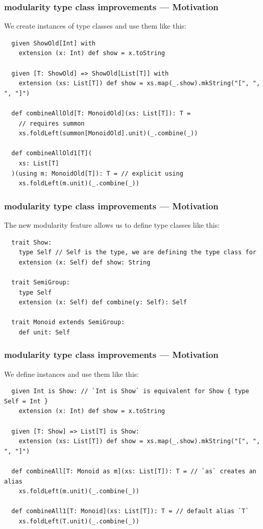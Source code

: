 \documentclass{beamer}
\begin{document}
\begin{frame}[fragile]
  \frametitle{modularity type class improvements --- Motivation}

  We create instances of type classes and use them like this:

  \begin{lstlisting}
  given ShowOld[Int] with
    extension (x: Int) def show = x.toString
  
  given [T: ShowOld] => ShowOld[List[T]] with
    extension (xs: List[T]) def show = xs.map(_.show).mkString("[", ", ", "]")
  
  def combineAllOld[T: MonoidOld](xs: List[T]): T =
    // requires summon
    xs.foldLeft(summon[MonoidOld].unit)(_.combine(_))

  def combineAllOld1[T](
    xs: List[T]
  )(using m: MonoidOld[T]): T = // explicit using
    xs.foldLeft(m.unit)(_.combine(_))
  \end{lstlisting}

\end{frame}

\begin{frame}[fragile]
  \frametitle{modularity type class improvements --- Motivation}

  The new modularity feature allows us to define type classes like this:

  \begin{lstlisting}
  trait Show:
    type Self // Self is the type, we are defining the type class for
    extension (x: Self) def show: String

  trait SemiGroup:
    type Self
    extension (x: Self) def combine(y: Self): Self

  trait Monoid extends SemiGroup:
    def unit: Self
  \end{lstlisting}

\end{frame}

\begin{frame}[fragile]
  \frametitle{modularity type class improvements --- Motivation}

  We define instances and use them like this:

  \begin{lstlisting}
  given Int is Show: // `Int is Show` is equivalent for Show { type Self = Int }
    extension (x: Int) def show = x.toString

  given [T: Show] => List[T] is Show:
    extension (xs: List[T]) def show = xs.map(_.show).mkString("[", ", ", "]")

  def combineAll[T: Monoid as m](xs: List[T]): T = // `as` creates an alias
    xs.foldLeft(m.unit)(_.combine(_))

  def combineAll1[T: Monoid](xs: List[T]): T = // default alias `T`
    xs.foldLeft(T.unit)(_.combine(_))
  \end{lstlisting}

\end{frame}
\end{document}
